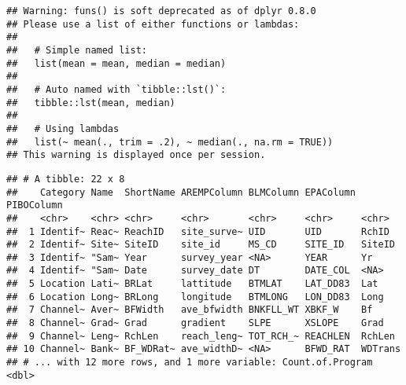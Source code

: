 \documentclass[]{article}
\newenvironment{Shaded}{\begin{snugshade}}{\end{snugshade}}
\newcommand{\DataTypeTok}[1]{\textcolor[rgb]{0.13,0.29,0.53}{#1}}
\newcommand{\KeywordTok}[1]{\textcolor[rgb]{0.13,0.29,0.53}{\textbf{#1}}}
\newcommand{\NormalTok}[1]{#1}
\newcommand{\OperatorTok}[1]{\textcolor[rgb]{0.81,0.36,0.00}{\textbf{#1}}}
\newcommand{\OtherTok}[1]{\textcolor[rgb]{0.56,0.35,0.01}{#1}}
\newcommand{\StringTok}[1]{\textcolor[rgb]{0.31,0.60,0.02}{#1}}
\begin{document}
\begin{verbatim}
## Warning: funs() is soft deprecated as of dplyr 0.8.0
## Please use a list of either functions or lambdas: 
## 
##   # Simple named list: 
##   list(mean = mean, median = median)
## 
##   # Auto named with `tibble::lst()`: 
##   tibble::lst(mean, median)
## 
##   # Using lambdas
##   list(~ mean(., trim = .2), ~ median(., na.rm = TRUE))
## This warning is displayed once per session.
\end{verbatim}

\begin{verbatim}
## # A tibble: 22 x 8
##    Category Name  ShortName AREMPColumn BLMColumn EPAColumn PIBOColumn
##    <chr>    <chr> <chr>     <chr>       <chr>     <chr>     <chr>     
##  1 Identif~ Reac~ ReachID   site_surve~ UID       UID       RchID     
##  2 Identif~ Site~ SiteID    site_id     MS_CD     SITE_ID   SiteID    
##  3 Identif~ "Sam~ Year      survey_year <NA>      YEAR      Yr        
##  4 Identif~ "Sam~ Date      survey_date DT        DATE_COL  <NA>      
##  5 Location Lati~ BRLat     lattitude   BTMLAT    LAT_DD83  Lat       
##  6 Location Long~ BRLong    longitude   BTMLONG   LON_DD83  Long      
##  7 Channel~ Aver~ BFWidth   ave_bfwidth BNKFLL_WT XBKF_W    Bf        
##  8 Channel~ Grad~ Grad      gradient    SLPE      XSLOPE    Grad      
##  9 Channel~ Leng~ RchLen    reach_leng~ TOT_RCH_~ REACHLEN  RchLen    
## 10 Channel~ Bank~ BF_WDRat~ ave_widthD~ <NA>      BFWD_RAT  WDTrans   
## # ... with 12 more rows, and 1 more variable: Count.of.Program <dbl>
\end{verbatim}

\begin{Shaded}
\end{Shaded}
\end{document}
